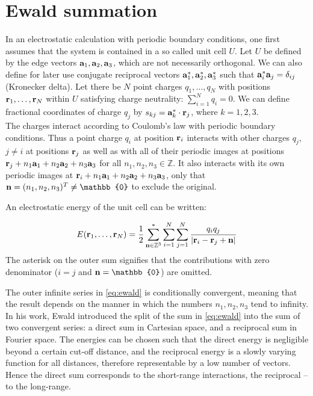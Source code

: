 \documentclass[12pt,a4paper]{report}
\begin{document}
\section{Ewald summation} \label{sec_ewald}
In an electrostatic calculation with periodic boundary conditions, one first assumes that the system is contained in a so called unit cell $U$. Let $U$ be defined by the edge vectors $\bold{a}_1, \bold{a}_2, \bold{a}_3$, which are not necessarily orthogonal. We can also define for later use conjugate reciprocal vectors $\bold{a}_1^*, \bold{a}_2^*, \bold{a}_3^*$ such that $\bold{a}_i^* \bold{a}_j = \delta_{ij}$ (Kronecker delta).
 Let there be $N$ point charges $q_1, \dotsc, q_N$ with positions $\bold{r}_1, \dotsc, \bold{r}_N$ within $U$ satisfying charge neutrality:  $\sum\limits_{i=1}^N q_i=0$. We can define fractional coordinates of charge $q_j$ by $s_{kj} = \bold{a}_k^* \cdot \bold{r}_j$, where $k = 1, 2, 3$. 
\\
The charges interact according to Coulomb’s law with periodic boundary conditions. Thus a point charge $q_i$ at position $\bold{r}_i$ interacts with
other charges $q_j$, $j \neq i$ at positions $\bold{r}_j$ as well as with all of
their periodic images at positions $\bold{r}_j + n_1 \bold{a}_1  + n_2 \bold{a}_2  + n_3 \bold{a}_3$ for
all $n_1, n_2 , n_3 \in \mathbb{Z}$. It also interacts with its own periodic
images at $\bold{r}_i + n_1 \bold{a}_1  + n_2 \bold{a}_2  + n_3 \bold{a}_3$, only that  $\bold{n} = (n_1, n_2, n_3)^T \neq \mathbb{0}$ to exclude the original. 

An electrostatic energy of the unit cell can be written:

\begin{equation} \label{eq:ewald}
E(\bold{r}_1, \dotsc, \bold{r}_N) = \frac{1}{2} \sum\limits_{\bold{n} \in \mathbb{Z}^3}^* \sum_{i=1}^N \sum\limits_{j=1}^N \frac{q_i q_j}{\lvert\bold{r}_i - \bold{r}_j + \bold{n} \rvert}
\end{equation}
The asterisk on the outer sum signifies that the contributions with zero denominator ($i =j$ and $\bold{n} = \mathbb{0}$) are omitted.

The outer infinite series in \eqref{eq:ewald} is conditionally convergent, meaning that the result depends on the manner in which the numbers $n_1, n_2, n_3$ tend to infinity.
In his work, Ewald \cite{ewald} introduced the split of the sum in \eqref{eq:ewald} into the sum of two convergent series: a direct sum in Cartesian space, and a
reciprocal sum in Fourier space. The energies can be chosen such that the direct energy is negligible beyond a certain cut-off distance, and the reciprocal energy is a slowly varying function for all distances, therefore representable by a low number of vectors. Hence the direct sum corresponds to the short-range interactions, the reciprocal -- to the long-range.
 
\end{document}
